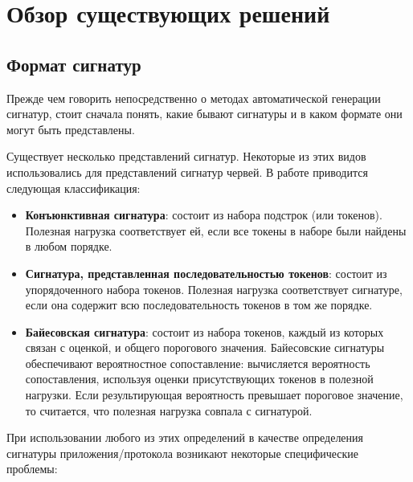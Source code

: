 \section{Обзор существующих решений}
\label{sec:Section2} 

\subsection{Формат сигнатур}

Прежде чем говорить непосредственно о методах автоматической генерации сигнатур, стоит сначала понять,
какие бывают сигнатуры и в каком формате они могут быть представлены.

Существует несколько представлений сигнатур. Некоторые из этих видов использовались для представлений сигнатур червей.
В работе \cite{newsome2005polygraph} приводится следующая классификация:

\begin{itemize}
    \item \textbf{Конъюнктивная сигнатура}: состоит из набора подстрок (или токенов).
    Полезная нагрузка соответствует ей, если все токены в наборе были найдены в любом порядке.
    \item \textbf{Сигнатура, представленная последовательностью токенов}: состоит из упорядоченного набора токенов.
    Полезная нагрузка соответствует сигнатуре, если она содержит всю последовательность токенов в том же порядке.
    \item \textbf{Байесовская сигнатура}: состоит из набора токенов, каждый из которых связан с оценкой, и общего порогового значения.
    Байесовские сигнатуры обеспечивают вероятностное сопоставление: вычисляется вероятность сопоставления,
    используя оценки присутствующих токенов в полезной нагрузки.
    Если результирующая вероятность превышает пороговое значение, то считается, что полезная нагрузка совпала с сигнатурой.
\end{itemize}

При использовании любого из этих определений в качестве определения сигнатуры приложения/протокола возникают
некоторые специфические проблемы:

